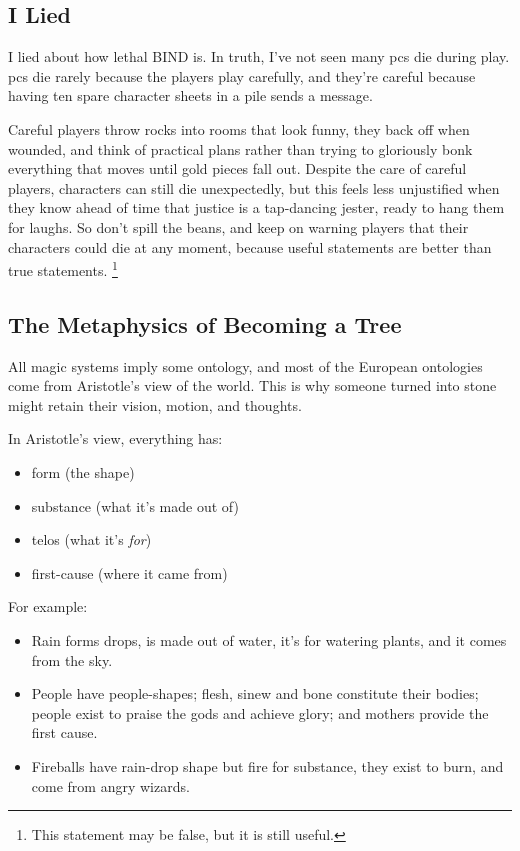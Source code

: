 \begin{multicols}{2}
\subsection{I Lied}
I lied about how lethal BIND is.
In truth, I've not seen many \glspl{pc} die during play.
\Glspl{pc} die rarely because the players play carefully, and they're careful because having ten spare character sheets in a pile sends a message.

Careful players throw rocks into rooms that look funny, they back off when wounded, and think of practical plans rather than trying to gloriously bonk everything that moves until gold pieces fall out.
Despite the care of careful players, characters can still die unexpectedly, but this feels less unjustified when they know ahead of time that justice is a tap-dancing jester, ready to hang them for laughs.
So don't spill the beans, and keep on warning players that their characters could die at any moment, because useful statements are better than true statements.%
\footnote{This statement may be false, but it is still useful.}

\subsection{The Metaphysics of Becoming a Tree}

All magic systems imply some ontology, and most of the European ontologies come from Aristotle's view of the world.
This is why someone turned into stone might retain their vision, motion, and thoughts.

In Aristotle's view, everything has:

\begin{itemize}
  \item
  form (the shape)
  \item
  substance (what it's made out of)
  \item
  telos (what it's \emph{for})
  \item
  first-cause (where it came from)
\end{itemize}

For example:

\begin{itemize}
  \item
  Rain forms drops, is made out of water, it's for watering plants, and it comes from the sky.
  \item
  People have people-shapes; flesh, sinew and bone constitute their bodies; people exist to praise the gods and achieve glory; and mothers provide the first cause.
  \item
  Fireballs have rain-drop shape but fire for substance, they exist to burn, and come from angry wizards.
\end{itemize}


\end{multicols}
